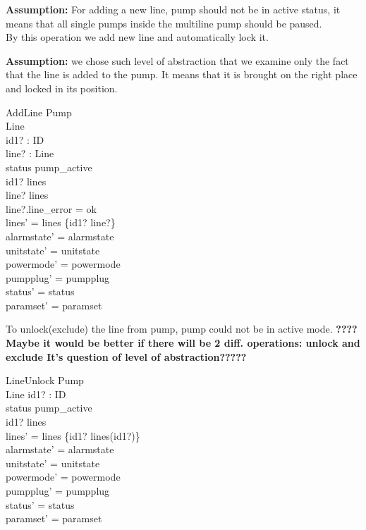\documentclass{article}
\begin{document}
		\textbf{Assumption:} For adding a new line, pump should not be in active status, it means that all single pumps inside the multiline pump should be paused.\\
		By this operation we add new line and automatically lock it.

\textbf{Assumption: } we chose such level of abstraction that we examine only the fact that the line is added to the pump. It means that it is brought on the right place and locked in its position.

    \begin{schema}{AddLine}
		\Delta Pump \\
		\Delta Line \\
		id1? : ID \\
		line? : Line \\
	\where
	    status \neq pump\_active \\
		id1? \notin \dom lines \\
		line? \notin \ran lines \\
		line?.line\_error = ok\\
    	lines' = lines \cup \{id1? \mapsto line?\} \\
    	alarmstate' = alarmstate \\
    	unitstate' = unitstate \\
    	powermode' = powermode \\
    	pumpplug' = pumpplug \\
    	status' = status \\
    	paramset' = paramset
	\end{schema}

	
To unlock(exclude) the line from pump, pump could not be in active mode.
\textbf{????Maybe it would be better if there will be 2 diff. operations: unlock and exclude It's question of level of abstraction?????}
	\begin{schema}{LineUnlock}
		\Delta Pump \\
		\Delta Line
		id1? : ID \\
	\where
		 status \neq pump\_active \\
		id1? \in \dom lines \\
		lines' = lines \setminus \{id1? \mapsto lines(id1?)\} \\
    	alarmstate' = alarmstate \\
    	unitstate' = unitstate \\
    	powermode' = powermode \\
    	pumpplug' = pumpplug \\
    	status' = status \\
    	paramset' = paramset
	\end{schema}
	
\end{document}
